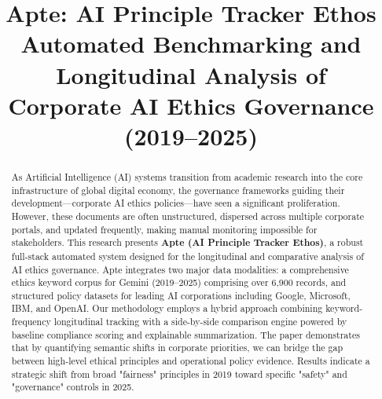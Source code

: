\documentclass[conference]{IEEEtran}
\begin{document}
\title{%
    \textbf{Apte: AI Principle Tracker Ethos}\\
    Automated Benchmarking and Longitudinal Analysis of \\
    Corporate AI Ethics Governance (2019--2025)%
}

\author{
}

\maketitle

\begin{abstract}
As Artificial Intelligence (AI) systems transition from academic research into the core infrastructure of global digital economy, the governance frameworks guiding their development—corporate AI ethics policies—have seen a significant proliferation. However, these documents are often unstructured, dispersed across multiple corporate portals, and updated frequently, making manual monitoring impossible for stakeholders. This research presents \textbf{Apte (AI Principle Tracker Ethos)}, a robust full-stack automated system designed for the longitudinal and comparative analysis of AI ethics governance. Apte integrates two major data modalities: a comprehensive ethics keyword corpus for Gemini (2019–2025) comprising over 6,900 records, and structured policy datasets for leading AI corporations including Google, Microsoft, IBM, and OpenAI. Our methodology employs a hybrid approach combining keyword-frequency longitudinal tracking with a side-by-side comparison engine powered by baseline compliance scoring and explainable summarization. The paper demonstrates that by quantifying semantic shifts in corporate priorities, we can bridge the gap between high-level ethical principles and operational policy evidence. Results indicate a strategic shift from broad "fairness" principles in 2019 toward specific "safety" and "governance" controls in 2025.
\end{abstract}
\end{document}
